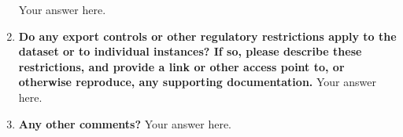 \documentclass{article}
\begin{document}
\begin{enumerate}[leftmargin=0.65cm]
        \newline 
        Your answer here.
        \newline 
        \item \textbf{Do any export controls or other regulatory restrictions apply to the dataset or to individual instances? If so, please describe these restrictions, and provide a link or other access point to, or otherwise reproduce, any supporting documentation.}
        \newline 
        Your answer here.
        \newline 
        \item \textbf{Any other comments?}
        \newline 
        Your answer here.
        \newline 
    \end{enumerate}
    
\end{document}
